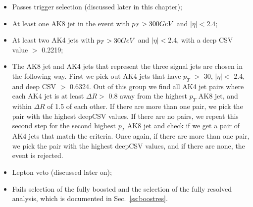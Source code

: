 \begin{itemize}
 \item Passes trigger selection (discussed later in this chapter);
 \item At least one AK8 jet in the event with $p_{T} > 300GeV$ and $|\eta| < 2.4$;
 \item At least two AK4 jets with $p_{T} > 30GeV$ and $|\eta| < 2.4$, with a deep CSV value $>$ 0.2219;
 \item The AK8 jet and AK4 jets that represent the three signal jets are chosen in the following way. First we pick out AK4 jets that have $p_{T}$ $>$ 30, $|\eta| <$ 2.4, and deep CSV $>$ 0.6324. Out of this group we find all AK4 jet pairs where each AK4 jet is at least $\Delta R >$ 0.8 away from the highest $p_{T}$ AK8 jet, and within $\Delta R$ of 1.5 of each other. If there are more than one pair, we pick the pair with the highest deepCSV values. If there are no pairs, we repeat this second step for the second highest $p_{T}$ AK8 jet and check if we get a pair of AK4 jets that match the criteria. Once again, if there are more than one pair, we pick the pair with the highest deepCSV values, and if there are none, the event is rejected. 
 \item Lepton veto (discussed later on);
  \item Fails selection of the fully boosted and the selection of the fully resolved analysis, which is documented in Sec.~\ref{ss:boostres}.
\end{itemize}

